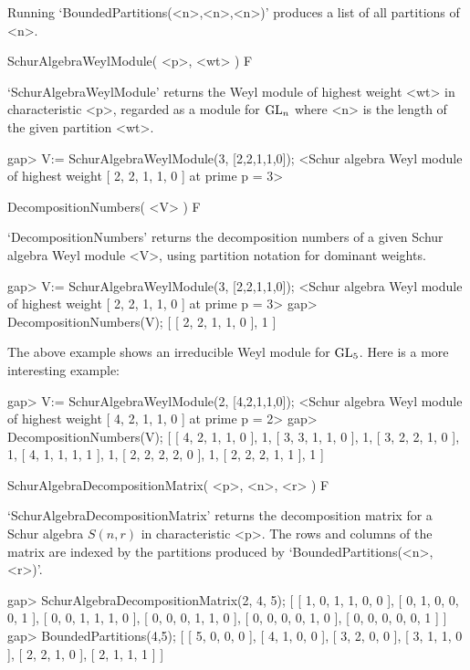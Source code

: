 Running `BoundedPartitions(<n>,<n>,<n>)' produces a list of all
partitions of <n>.



\>SchurAlgebraWeylModule( <p>, <wt> ) F

`SchurAlgebraWeylModule' returns the Weyl module of highest weight
<wt> in characteristic <p>, regarded as a module for ${\rm GL}_n$
where <n> is the length of the given partition <wt>.

\beginexample
gap> V:= SchurAlgebraWeylModule(3, [2,2,1,1,0]);
<Schur algebra Weyl module of highest weight [ 2, 2, 1, 1, 0 ] at prime p = 3>
\endexample

\>DecompositionNumbers( <V> ) F

`DecompositionNumbers' returns the decomposition numbers of a given
Schur algebra Weyl module <V>, using partition notation for dominant
weights.

\beginexample
gap> V:= SchurAlgebraWeylModule(3, [2,2,1,1,0]);
<Schur algebra Weyl module of highest weight [ 2, 2, 1, 1, 0 ] at prime p = 3>
gap> DecompositionNumbers(V);
[ [ 2, 2, 1, 1, 0 ], 1 ]
\endexample

The above example shows an irreducible Weyl module for ${\rm
  GL}_5$. Here is a more interesting example:

\beginexample
gap> V:= SchurAlgebraWeylModule(2, [4,2,1,1,0]);
<Schur algebra Weyl module of highest weight [ 4, 2, 1, 1, 0 ] at prime p = 2>
gap> DecompositionNumbers(V);                   
[ [ 4, 2, 1, 1, 0 ], 1, [ 3, 3, 1, 1, 0 ], 1, [ 3, 2, 2, 1, 0 ], 1, 
  [ 4, 1, 1, 1, 1 ], 1, [ 2, 2, 2, 2, 0 ], 1, [ 2, 2, 2, 1, 1 ], 1 ]
\endexample


\>SchurAlgebraDecompositionMatrix( <p>, <n>, <r> ) F

`SchurAlgebraDecompositionMatrix' returns the decomposition matrix for
a Schur algebra $S(n,r)$ in characteristic <p>. The rows and columns
of the matrix are indexed by the partitions produced by
`BoundedPartitions(<n>,<r>)'.

\beginexample
gap> SchurAlgebraDecompositionMatrix(2, 4, 5);
[ [ 1, 0, 1, 1, 0, 0 ], [ 0, 1, 0, 0, 0, 1 ], [ 0, 0, 1, 1, 1, 0 ], 
  [ 0, 0, 0, 1, 1, 0 ], [ 0, 0, 0, 0, 1, 0 ], [ 0, 0, 0, 0, 0, 1 ] ]
gap> BoundedPartitions(4,5);
[ [ 5, 0, 0, 0 ], [ 4, 1, 0, 0 ], [ 3, 2, 0, 0 ], [ 3, 1, 1, 0 ], 
  [ 2, 2, 1, 0 ], [ 2, 1, 1, 1 ] ]
\endexample




